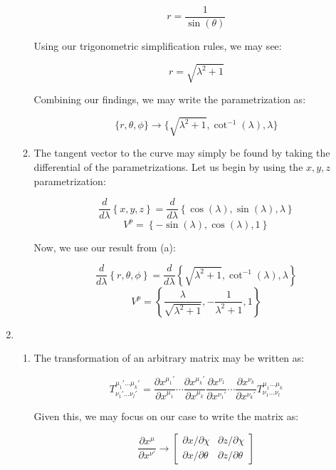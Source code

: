 \begin{enumerate}
\begin{enumerate}
        $$r=\frac{1}{\sin(\theta)}$$

        Using our trigonometric simplification rules, we may see:

        $$r=\sqrt{\lambda^2+1}$$

        Combining our findings, we may write the parametrization as:

        $$\boxed{\{r,\theta,\phi\}\to\{\sqrt{\lambda^2+1},\cot^{-1}(\lambda),\lambda\}}$$

      \item 

        The tangent vector to the curve may simply be found by taking the differential of the parametrizations. Let us begin by using the $x,y,z$ parametrization:

        $$\frac{d}{d\lambda}\left\{ x,y,z \right\}=\frac{d}{d\lambda}\left\{ \cos(\lambda),\sin(\lambda),\lambda \right\}$$
        $$\boxed{V^p=\left\{ -\sin(\lambda),\cos(\lambda),1 \right\}}$$

        Now, we use our result from (a):

        $$\frac{d}{d\lambda}\left\{ r,\theta,\phi \right\}=\frac{d}{d\lambda}\left\{ \sqrt{\lambda^2+1},\cot^{-1}(\lambda), \lambda\right\}$$
        $$\boxed{V^p=\left\{ \frac{\lambda}{\sqrt{\lambda^2+1}},-\frac{1}{\lambda^2+1}, 1 \right\}}$$

    \end{enumerate}

  \item

    \begin{enumerate}

      \item 

        The transformation of an arbitrary matrix may be written as:

        $$T^{\mu_1\prime\ldots\mu_{k}\prime}_{\nu_1\prime\ldots\nu_l\prime}=\frac{\partial x^{\mu_1\prime}}{\partial x^{\mu_1}}\cdots\frac{\partial x^{\mu_k\prime}}{\partial x^{\mu_k}}\frac{\partial x^{\nu_1}}{\partial x^{\nu_1\prime}}\cdots\frac{\partial x^{\nu_k}}{\partial x^{\nu_k\prime}}T^{\mu_1\ldots\mu_k}_{\nu_1\ldots\nu_l}$$

        Given this, we may focus on our case to write the matrix as:

        $$\frac{\partial x^{\mu}}{\partial x^{\nu'}}\to\left[ \begin{matrix} \partial x/\partial \chi & \partial z/\partial\chi\\ \partial x/\partial \theta & \partial z/\partial\theta \end{matrix} \right]$$


\end{enumerate}
\end{enumerate}
